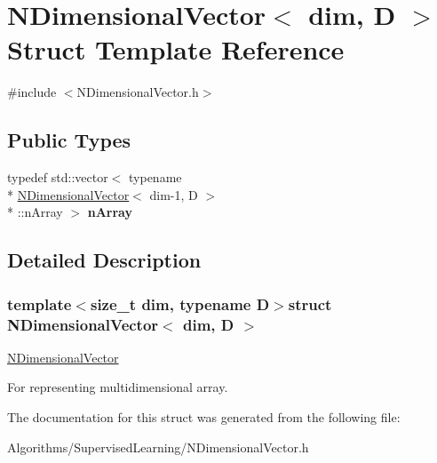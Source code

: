 \hypertarget{structNDimensionalVector}{\section{N\+Dimensional\+Vector$<$ dim, D $>$ Struct Template Reference}
\label{structNDimensionalVector}
}


{\ttfamily \#include $<$N\+Dimensional\+Vector.\+h$>$}

\subsection*{Public Types}
\begin{DoxyCompactItemize}
\item 
\hypertarget{structNDimensionalVector_ae933e15c6af2eaed20472909b7030090}{typedef std\+::vector$<$ typename \\*
\hyperlink{structNDimensionalVector}{N\+Dimensional\+Vector}$<$ dim-\/1, D $>$\\*
\+::n\+Array $>$ {\bfseries n\+Array}}\label{structNDimensionalVector_ae933e15c6af2eaed20472909b7030090}

\end{DoxyCompactItemize}


\subsection{Detailed Description}
\subsubsection*{template$<$size\+\_\+t dim, typename D$>$struct N\+Dimensional\+Vector$<$ dim, D $>$}

\hyperlink{structNDimensionalVector}{N\+Dimensional\+Vector}

For representing multidimensional array. 

The documentation for this struct was generated from the following file\+:\begin{DoxyCompactItemize}
\item 
Algorithms/\+Supervised\+Learning/N\+Dimensional\+Vector.\+h\end{DoxyCompactItemize}
